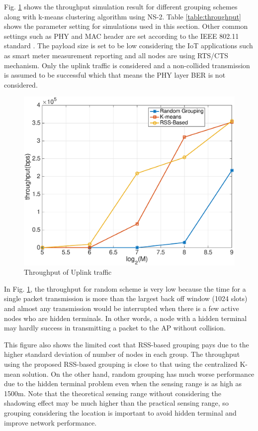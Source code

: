 Fig. \ref{fig:throughput} shows the throughput simulation result for different grouping schemes along with k-means clustering algorithm using NS-2. Table \ref{table:throughput} shows the parameter setting for simulations used in this section. Other common settings such as PHY and MAC header are set according to the IEEE 802.11 standard \cite{wlan2011}. The payload size is set to be low considering the IoT applications such as smart meter measurement reporting and all nodes are using RTS/CTS mechanism. Only the uplink traffic is considered and a non-collided transmission is assumed to be successful which that means the PHY layer BER is not considered. 

\begin{figure} 
  \centering
  \includegraphics[width=.95\textwidth]{figures/throughput}
  \caption{Throughput of Uplink traffic}
  \label{fig:throughput}
\end{figure}

 In Fig. \ref{fig:throughput}, the throughput for random scheme is very low because the time for a single packet transmission is more than the largest back off window (1024 slots) and almost any transmission would be interrupted when there is a few active nodes who are hidden terminals. In other words, a node with a hidden terminal may hardly success in transmitting a packet to the AP without collision.

This figure also shows the limited cost that RSS-based grouping pays due to the higher standard deviation of number of nodes in each group. The throughput using the proposed RSS-based grouping is close to that using the centralized K-mean solution. On the other hand, random grouping has much worse performance due to the hidden terminal problem even when the sensing range is as high as 1500m. Note that the theoretical sensing range without considering the shadowing effect may be much higher than the practical sensing range, so grouping considering the location is important to avoid hidden terminal and improve network performance.


